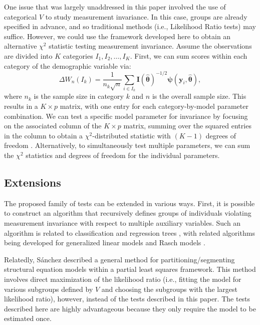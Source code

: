 \documentclass[man]{apa}
\begin{document}
One issue that was largely unaddressed in this paper involved the use
of categorical $V$ to study measurement invariance.  In this case,
groups are 
already specified in advance, and so traditional methods (i.e.,
Likelihood Ratio tests) may suffice.
However, we could use the framework developed here to obtain an
alternative $\chi^2$ statistic testing measurement invariance.
Assume the observations are divided into $K$ categories $I_1, I_2,
\ldots, I_K$.
First, we can sum scores within each category of the
demographic variable via:
\begin{equation}
    \label{eq:catsum}
    \Delta W_n(I_k) = \frac{1}{n_k\sqrt{n}} \sum_{i \in I_k}
    {\bm{I}}(\widehat{\bm{\theta}})^{-1/2} {\bm{\psi}}({\bm{y}}_i, \widehat{{\bm
      \theta}}),
\end{equation}
where $n_k$ is the sample size in category $k$ and $n$ is the overall
sample size.  This results in a $K \times p$ matrix, with one entry for
each category-by-model parameter combination.  We can test
a specific model parameter for invariance by focusing on the associated
column of the $K \times p$ matrix, summing over the squared entries in
the column to obtain a $\chi^2$-distributed statistic with
$(K-1)$ degrees of freedom \cite{HjoKon02}.
Alternatively, to simultaneously test multiple parameters, we can sum
the $\chi^2$ statistics and degrees of freedom for the individual
parameters.

\subsection{Extensions}
The proposed family of tests can be extended in various ways.  First,
it is possible to construct an algorithm that recursively defines
groups of individuals violating measurement invariance with respect to
multiple auxiliary variables.  Such an algorithm is related to 
classification and regression trees \cite{BreFri84,MerSha10,StrMal09},
with related algorithms being developed for generalized linear
models \cite{ZeiHot08} and Rasch models \cite{KopZei10}.  

Relatedly,
S\'{a}nchez \citeyear{San09} described a general
method for partitioning/segmenting structural equation models within a 
partial least squares framework.  This method involves direct maximization of
the likelihood ratio (i.e., fitting the model for various subgroups
defined by 
$V$ and choosing the subgroups with the largest likelihood ratio),
however, instead of the tests described in this paper.  The tests
described here are highly advantageous because they only require the
model to be estimated once.
\end{document}
